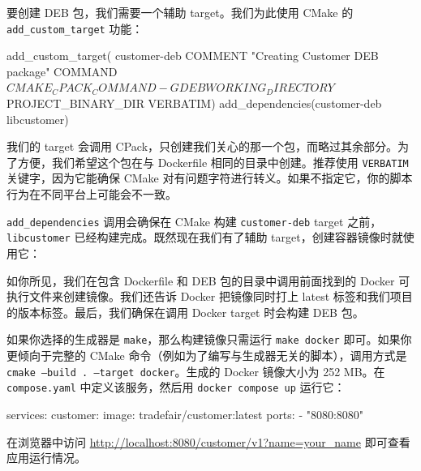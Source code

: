要创建 DEB 包，我们需要一个辅助 target。我们为此使用 CMake 的 \texttt{add\_\allowbreak{}custom\_\allowbreak{}target} 功能：

\begin{codebox}[text]
add_custom_target(
   customer-deb
   COMMENT "Creating Customer DEB package"
   COMMAND ${CMAKE_CPACK_COMMAND} -G DEB
   WORKING_DIRECTORY ${PROJECT_BINARY_DIR}
   VERBATIM)
 add_dependencies(customer-deb libcustomer)
\end{codebox}

我们的 target 会调用 CPack，只创建我们关心的那一个包，而略过其余部分。为了方便，我们希望这个包在与 Dockerfile 相同的目录中创建。推荐使用 \texttt{VERBATIM} 关键字，因为它能确保 CMake 对有问题字符进行转义。如果不指定它，你的脚本行为在不同平台上可能会不一致。

\texttt{add\_\allowbreak{}dependencies} 调用会确保在 CMake 构建 \texttt{customer-deb} target 之前，\texttt{libcustomer} 已经构建完成。既然现在我们有了辅助 target，创建容器镜像时就使用它：


\label{idx:1788}
\label{idx:1789}
如你所见，我们在包含 Dockerfile 和 DEB 包的目录中调用前面找到的 Docker 可执行文件来创建镜像。我们还告诉 Docker 把镜像同时打上 latest 标签和我们项目的版本标签。最后，我们确保在调用 Docker target 时会构建 DEB 包。

如果你选择的生成器是 \texttt{make}，那么构建镜像只需运行 \texttt{make docker} 即可。如果你更倾向于完整的 CMake 命令（例如为了编写与生成器无关的脚本），调用方式是 \texttt{cmake --build .\allowbreak{} --target docker}。生成的 Docker 镜像大小为 252 MB。在 \texttt{compose.\allowbreak{}yaml} 中定义该服务，然后用 \texttt{docker compose up} 运行它：

\begin{codebox}[yaml]
services:
  customer:
    image: tradefair/customer:latest
    ports:
      - "8080:8080"
\end{codebox}

在浏览器中访问 \href{http://localhost:8080/customer/v1?name=your_name}{http://localhost:8080/customer/v1?name=your\_name} 即可查看应用运行情况。

